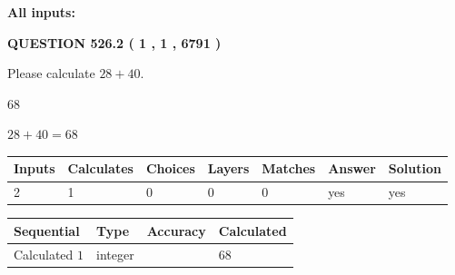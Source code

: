 \documentclass[12pt]{article}
\begin{document}
   
   
   
\noindent\vspace{0.1in}\hspace{-0.08in} {\textbf{\Large{All inputs: }}}
   
   
  
\vspace{0.2in}
  
{\textbf{\Large{QUESTION
526.2 
 ( 1 , 1 , 6791 )
}}}
  
  
 
Please calculate $ %
28 +  %
40 $.
 
 
 
\noindent{}
 
 

68
 
 
\noindent{}
 
 

 
 
 
\noindent{}
 
 

$ %
28 +  %
40=   %
68$
 
 
\noindent{}
 
 

 
   
   
   
   
\noindent\begin{tabular}{|l|l|l|l|l|l|l|}
 \hline
Inputs & Calculates & Choices & Layers & Matches & Answer & Solution \\ \hline
 2  & 
 1  & 
 0
  & 
 0  & 
 0  & 
  yes & 
  yes 
  \\ \hline
 \end{tabular}
   
   
   
   
\noindent{}
   
   
  
  
\noindent\begin{tabular}{|l|l|l|l|}
\hline
 Sequential & Type & Accuracy & Calculated \\ 
\hline
 
 
  Calculated $  1 $ & integer &  & 
  $ 68 $ 
 \\  \hline  
 \end{tabular}
   
\end{document}
